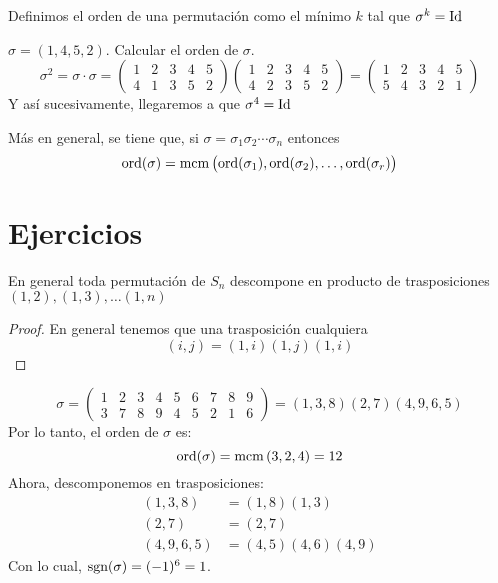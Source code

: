 \begin{defi}
    Definimos el orden de una permutación como el mínimo $k$ tal que $\sigma^k = \operatorname{Id}$
\end{defi}

\begin{example}
    $\sigma = (1, 4, 5, 2)$. Calcular el orden de $\sigma$.
    \[
        \sigma^2 = \sigma \cdot \sigma =
        \begin{pmatrix}
            1 & 2 & 3 & 4 & 5 \\
            4 & 1 & 3 & 5 &2
        \end{pmatrix}
        \begin{pmatrix}
            1 & 2 & 3 & 4 & 5 \\
            4 & 2 & 3 & 5 & 2
        \end{pmatrix} = 
        \begin{pmatrix}
            1 & 2 & 3 & 4 & 5 \\
            5 & 4 & 3 & 2 & 1
        \end{pmatrix}
    \]
    Y así sucesivamente, llegaremos a que $\sigma^4 = \operatorname{Id}$
\end{example}

Más en general, se tiene que, si $\sigma = \sigma_1 \sigma_2 \cdots \sigma_n$ entonces
\[
    \operatorname{ord}(\sigma) = \operatorname{mcm} \left( \operatorname{ord} (\sigma_1), \operatorname{ord}(\sigma_2), \dots, \operatorname{ord}(\sigma_r) \right)
\]

\section{Ejercicios}

\begin{ej} %
    En general toda permutación de $S_n$ descompone en producto de trasposiciones
    $(1, 2), (1, 3), \dots (1, n)$
\end{ej}

\begin{proof}
    En general tenemos que una trasposición cualquiera
    \[
        (i, j) = (1, i)(1, j)(1,i)
    \]
\end{proof}

\begin{ej}
    \[
        \sigma =
        \begin{pmatrix}
            1 & 2 & 3 & 4 & 5 & 6 & 7 & 8 & 9 \\
            3 & 7 & 8 & 9 & 4 & 5 & 2 & 1 & 6
        \end{pmatrix}
        = (1, 3, 8) (2, 7) (4, 9, 6, 5)
    \]
    Por lo tanto, el orden de $\sigma$ es:
    \[
        \operatorname{ord}(\sigma) = \operatorname{mcm}\left( 3, 2, 4 \right) = 12
    \]
    Ahora, descomponemos en trasposiciones:
    \[
        \begin{aligned}
            (1, 3, 8) &= (1, 8) (1, 3) \\
            (2, 7) &= (2, 7) \\
            (4, 9, 6, 5) &= (4, 5) (4, 6) (4, 9)
        \end{aligned}
    \]
    Con lo cual, $\text{sgn}(\sigma) = (-1)^6 = 1$.
\end{ej}

